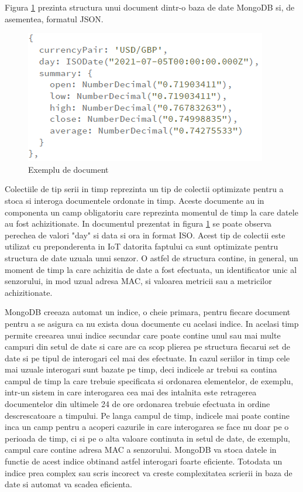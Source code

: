 Figura \ref{fig:MongoDBDocument} prezinta structura unui document dintr-o baza de date MongoDB si, de asementea, formatul JSON.
\begin{figure}[H]
    \centering
    \includegraphics[scale=0.8]{figs/mongoDBDocument.png}
    \caption{Exemplu de document \cite{mongoDB}}
    \label{fig:MongoDBDocument}
\end{figure}

Colectiile de tip serii in timp reprezinta un tip de colectii optimizate pentru a stoca si interoga documentele ordonate in timp. Aceste documente au in 
componenta un camp obligatoriu care reprezinta momentul de timp la care datele au fost achizitionate. In documentul prezentat in figura \ref{fig:MongoDBDocument} 
se poate observa perechea de valori "day" si data si ora in format ISO. Acest tip de colectii este utilizat cu preponderenta in IoT datorita faptului ca sunt 
optimizate pentru structura de date uzuala unui senzor. O astfel de structura contine, in general, un moment de timp la care achizitia de date a fost efectuata, 
un identificator unic al senzorului, in mod uzual adresa MAC, si valoarea metricii sau a metricilor achizitionate.

MongoDB creeaza automat un indice, o cheie primara, pentru fiecare document pentru a se asigura ca nu exista doua documente cu acelasi indice. In acelasi timp 
permite creearea unui indice secundar care poate contine unul sau mai multe campuri din setul de date si care are ca scop plierea pe structura fiecarui set de date 
si pe tipul de interogari cel mai des efectuate. In cazul seriilor in timp cele mai uzuale interogari sunt bazate pe timp, deci indicele ar trebui sa contina campul 
de timp la care trebuie specificata si ordonarea elementelor, de exemplu, intr-un sistem in care interogarea cea mai des intalnita este retragerea documentelor 
din ultimele 24 de ore ordonarea trebuie efectuata in ordine descrescatoare a timpului. Pe langa campul de timp, indicele mai poate contine inca un camp pentru 
a acoperi cazurile in care interogarea se face nu doar pe o perioada de timp, ci si pe o alta valoare continuta in setul de date, de exemplu, campul care contine 
adresa MAC a senzorului. MongoDB va stoca datele in functie de acest indice obtinand astfel interogari foarte eficiente. Totodata un indice prea complex sau 
scris incorect va creste complexitatea scrierii in baza de date si automat va scadea eficienta. 


